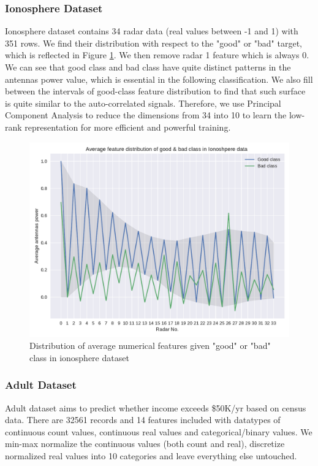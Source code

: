 \documentclass[11pt]{scrartcl}
\begin{document}
\subsubsection*{Ionosphere Dataset}
Ionosphere dataset contains 34 radar data (real values between -1 and 1) with 351 rows\cite{sigillito1989classification}. We find their distribution with respect to the "good" or "bad" target, which is reflected in Figure \ref{iono_feat}. We then remove radar 1 feature which is always 0. We can see that good class and bad class have quite distinct patterns in the antennas power value, which is essential in the following classification. We also fill between the intervals of good-class feature distribution to find that such surface is quite similar to the auto-correlated signals. Therefore, we use Principal Component Analysis to reduce the dimensions from 34 into 10 to learn the low-rank representation for more efficient and powerful training.

\begin{figure}[t]
	\centering
	\includegraphics[width=0.7\linewidth]{fig/iono_feat_dist.pdf}
	\caption{Distribution of average numerical features given "good" or "bad" class in ionosphere dataset}
	\label{iono_feat}
\end{figure}

\subsubsection*{Adult Dataset}
Adult dataset aims to predict whether income exceeds \$50K/yr based on census data\cite{kohavi1996scaling}. There are 32561 records and 14 features included with datatypes of continuous count values, continuous real values and categorical/binary values. We min-max normalize the continuous values (both count and real),  discretize normalized real values into 10 categories and leave everything else untouched.
\end{document}

